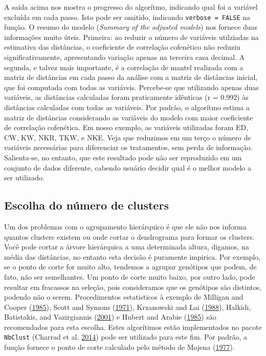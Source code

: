 \documentclass[
]{book}
\numberwithin{equation}{section}
\newcommand{\indt}[1]{\index{#1|ST}}
\begin{document}
A saída acima nos mostra o progresso do algorítmo, indicando qual foi a variável excluída em cada passo. Isto pode ser omitido, indicando \texttt{verbose\ =\ FALSE} na função. O resumo do modelo (\emph{Summary of the adjusted models}) nos fornece duas informações muito úteis. Primeira: ao reduzir o número de variáveis utilziadas na estimativa das distâncias, o coeficiente de correlação cofenético não reduziu significativamente, apresentando variação apenas na terceira casa decimal. A segunda, e talvez mais importante, é a correlação de mantel realizada com a matriz de distâncias em cada passo da análise com a matriz de distâncias inicial, que foi computada com todas as variáveis. Percebe-se que utilizando apenas duas variáveis, as distâncias calculadas foram praticamente idênticas (r = 0.992) às distâncias calculadas com todas as variáveis. Por padrão, o algorítmo estima a matriz de distâncias considerando as variáveis do modelo com maior coeficiente de correlação cofenética. Em nosso exemplo, as variáveis utilizadas foram ED, CW, KW, NKR, TKW, e NKE. Veja que reduzimos em um terço o número de variáveis necessárias para diferenciar os tratamentos, sem perda de informação. Salienta-se, no entanto, que este resultado pode não ser reproduzido em um conjunto de dados diferente, cabendo usuário decidir qual é o melhor modelo a ser utilizado.

\hypertarget{escolha-do-nuxfamero-de-clusters}{%
\subsection{Escolha do número de clusters}\label{escolha-do-nuxfamero-de-clusters}}

Um dos problemas com o agrupamento \indt{agrupamento} hierárquico é que ele não nos informa quantos clusters existem ou onde cortar o dendrograma \indt{dendrograma} para formar os clusters. Você pode cortar a árvore hierárquica a uma determinada altura, digamos, na média das distâncias, no entanto esta decisão é puramente impirica. Por exemplo, se o ponto de corte for muito alto, tendemos a agrupar genótipos que podem, de fato, não ser semelhantes. Um ponto de corte muito baixo, por outro lado, pode resultar em fracassos na seleção, pois consideramos que os genótipos são distintos, podendo não o serem. Procedimentos estatisticos à exemplo de Milligan and Cooper (\protect\hyperlink{ref-Milligan1985}{1985}), Scott and Symons (\protect\hyperlink{ref-Scott1971}{1971}), Krzanowski and Lai (\protect\hyperlink{ref-Krzanowski1988}{1988}), Halkidi, Batistakis, and Vazirgiannis (\protect\hyperlink{ref-Halkidi2001}{2001}) e Hubert and Arabie (\protect\hyperlink{ref-Hubert1985}{1985}) são recomendados para esta escolha. Estes algorítimos estão implementados no pacote \texttt{NbClust} (Charrad et al. \protect\hyperlink{ref-Charrad2014}{2014}) pode ser utilizado para este fim. Por padrão, a função fornece o ponto de corte calculado pelo método de Mojena (\protect\hyperlink{ref-Mojena1977}{1977}).
\end{document}
